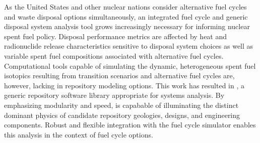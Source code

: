 As the United States and other nuclear nations consider alternative fuel cycles 
and waste disposal options simultaneously, an integrated fuel cycle and generic disposal system 
analysis tool grows increasingly necessary for informing nuclear spent 
fuel policy. Disposal performance metrics are affected by heat and radionuclide release 
characteristics sensitive to disposal system choices as well as variable spent 
fuel compositions associated  with alternative fuel cycles.  Computational 
tools capable of simulating the dynamic, heterogeneous spent fuel isotopics 
resulting from transition scenarios and alternative fuel cycles are, however, 
lacking in repository modeling  options.  This work has resulted in \Cyder, a 
generic repository software library appropriate for systems analysis.  By emphasizing 
modularity and speed, \Cyder is capabable of illuminating the distinct dominant 
physics of candidate repository geologies, designs, and engineering components. 
Robust and flexible integration with the \Cyclus fuel cycle simulator
enables this analysis in the context of fuel cycle options.  

\glsresetall
